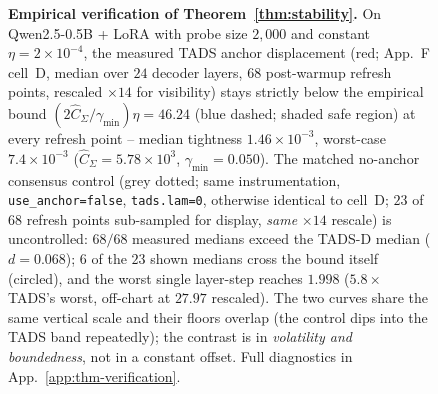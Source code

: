 \begin{figure}[t]
{%
}
\caption{\textbf{Empirical verification of Theorem~\ref{thm:stability}.}
On Qwen2.5-0.5B + LoRA with probe size $2{,}000$ and constant
$\eta = 2\times 10^{-4}$, the measured \textsc{TADS} anchor
displacement (red; App.~F cell~D, median over $24$ decoder layers,
$68$ post-warmup refresh points, rescaled $\times 14$ for
visibility) stays strictly below the empirical bound
$(2\hat{C}_\Sigma / \gamma_{\min})\eta = 46.24$ (blue dashed; shaded
safe region) at every refresh point -- median tightness
$1.46\times 10^{-3}$, worst-case $7.4\times 10^{-3}$
($\hat{C}_\Sigma = 5.78\times 10^{3}$, $\gamma_{\min} = 0.050$).
The matched no-anchor consensus control (grey dotted; same
instrumentation, \texttt{use\_anchor=false}, \texttt{tads.lam=0},
otherwise identical to cell~D; $23$ of $68$ refresh points
sub-sampled for display, \emph{same} $\times 14$ rescale) is
uncontrolled: $68/68$ measured medians exceed the \textsc{TADS}-D
median ($d=0.068$); $6$ of the $23$ shown medians cross the bound
itself (circled), and the worst single layer-step reaches $1.998$
($5.8\times$ \textsc{TADS}'s worst, off-chart at $27.97$ rescaled).
The two curves share the same vertical scale and their floors
overlap (the control dips into the \textsc{TADS} band repeatedly);
the contrast is in \emph{volatility and boundedness}, not in a
constant offset. Full diagnostics in
App.~\ref{app:thm-verification}.}
\label{fig:thm-main}
\end{figure}
